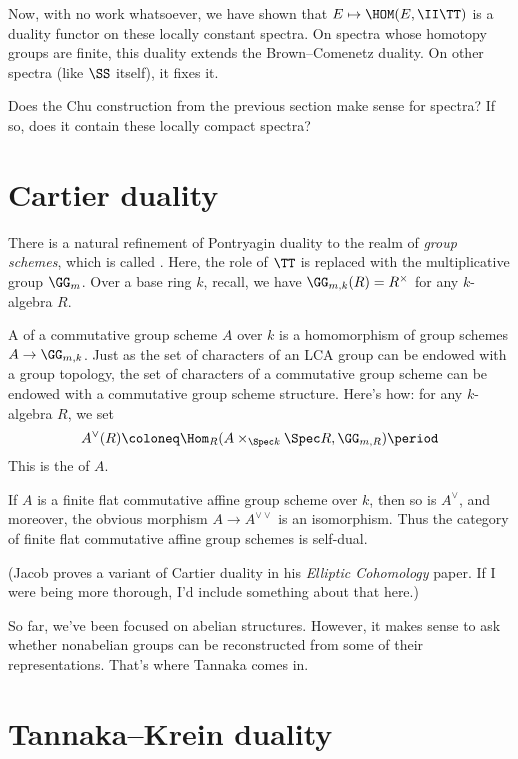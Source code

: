 \documentclass[leqno]{article}
\begin{document}
Now, with no work whatsoever,
we have shown that \(E \mapsto \HOM(E, \II\TT)\) is a
duality functor on these locally constant spectra.
On spectra whose homotopy groups are finite,
this duality extends the Brown--Comenetz duality.
On other spectra (like \(\SS\) itself), it fixes it.

\begin{qst}
    Does the Chu construction from the previous section
    make sense for spectra?
    If so, does it contain these locally compact spectra?
\end{qst}

\section{Cartier duality}%
\label{cartier}

There is a natural refinement of Pontryagin duality to the realm
of \emph{group schemes}, which is called .
Here, the role of \(\TT\) is replaced with
the multiplicative group \(\GG_m\).
Over a base ring \(k\), recall, we have
\(\GG_{m,k}(R) = R^{\times}\) for any \(k\)-algebra \(R\).

A 
of a commutative group scheme \(A\)
over \(k\)
is a homomorphism of group schemes \(A \to \GG_{m,k}\).
Just as the set of characters of an LCA group
can be endowed with a group topology,
the set of characters of a commutative group scheme
can be endowed with a commutative group scheme structure.
Here's how: for any \(k\)-algebra \(R\),
we set
\begin{equation*}
    A^{\vee}(R) \coloneq
    \Hom_R(A \times_{\Spec k} \Spec R, \GG_{m,R}) \period
\end{equation*}
This is the  of \(A\).

If \(A\) is a finite flat commutative affine group scheme over \(k\),
then so is \(A^{\vee}\), and moreover, the obvious morphism
\(A \to A^{\vee\vee}\) is an isomorphism.
Thus the category of finite flat commutative affine group schemes
is self-dual.

(Jacob proves a variant of Cartier duality in his
\emph{Elliptic Cohomology} paper.
If I were being more thorough,
I'd include something about that here.) 

So far, we've been focused on abelian structures.
However, it makes sense to ask whether nonabelian groups
can be reconstructed from some of their representations.
That's where Tannaka comes in.

\section{Tannaka--Krein duality}%
\label{tannakakrein}
\end{document}
